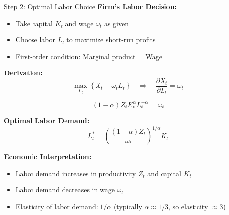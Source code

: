 \documentclass{beamer}
\begin{document}
\begin{frame}{Step 2: Optimal Labor Choice}
    \textbf{Firm's Labor Decision:}
    \begin{itemize}
        \item Take capital $K_t$ and wage $\omega_t$ as given
        \item Choose labor $L_t$ to maximize short-run profits
        \item First-order condition: Marginal product = Wage
    \end{itemize}
    
    \vspace{0.2cm}
    \textbf{Derivation:}
    \begin{equation*}
        \max_{L_t} \left\{ X_t - \omega_t L_t \right\} \quad \Rightarrow \quad \frac{\partial X_t}{\partial L_t} = \omega_t
    \end{equation*}
    
    \begin{equation*}
        (1-\alpha) Z_t K_t^\alpha L_t^{-\alpha} = \omega_t
    \end{equation*}
    
    \textbf{Optimal Labor Demand:}
    \begin{equation}\label{equ:optimal labor supply}
        L_t^* = \left(\frac{(1-\alpha)Z_t}{\omega_t}\right)^{1/\alpha} K_t
    \end{equation}
    
    \vspace{0.2cm}
    \textbf{Economic Interpretation:}
    \begin{itemize}
        \item Labor demand increases in productivity $Z_t$ and capital $K_t$
        \item Labor demand decreases in wage $\omega_t$
        \item Elasticity of labor demand: $1/\alpha$ (typically $\alpha \approx 1/3$, so elasticity $\approx 3$)
    \end{itemize}
\end{frame}
\end{document}
